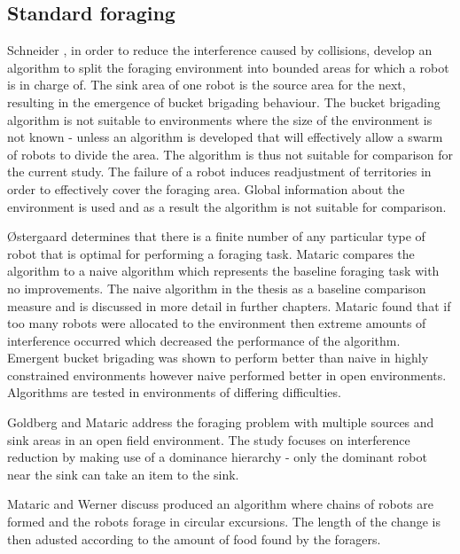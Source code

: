 \subsection{Standard foraging}
\label{standardforaging}

Schneider \cite{schneider1998territorial}, in order to reduce the interference caused by collisions, develop an algorithm to split the foraging environment into bounded areas for which a robot is in charge of. The sink area of one robot is the source area for the next, resulting in the emergence of bucket brigading behaviour. The bucket brigading algorithm is not suitable to environments where the size of the environment is not known - unless an algorithm is developed that will effectively allow a swarm of robots to divide the area. The algorithm is thus not suitable for comparison for the current study. The failure of a robot induces readjustment of territories in order to effectively cover the foraging area. Global information about the environment is used and as a result the algorithm is not suitable for comparison. %

\O stergaard \cite{ostergaard2001emergent} determines that there is a finite number of any particular type of robot that is optimal for performing a foraging task. Mataric compares the algorithm to a naive algorithm which represents the baseline foraging task with no improvements. The naive algorithm in the thesis as a baseline comparison measure and is discussed in more detail in further chapters. Mataric found that if too many robots were allocated to the environment then extreme amounts of interference occurred which decreased the performance of the algorithm. Emergent bucket brigading was shown to perform better than naive in highly constrained environments however naive performed better in open environments. Algorithms are tested in environments of differing difficulties. %

Goldberg and Mataric \cite{Goldberg01designand} address the foraging problem with multiple sources and sink areas in an open field environment. The study focuses on interference reduction by making use of a dominance hierarchy - only the dominant robot near the sink can take an item to the sink. %

Mataric \cite{werger1996robotic} and Werner discuss produced an algorithm where chains of robots are formed and the robots forage in circular excursions. The length of the change is then adusted according to the amount of food found by the foragers. %
 
